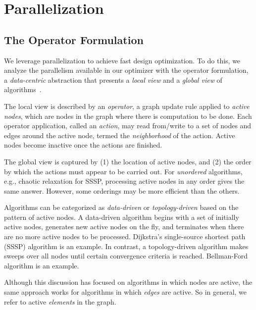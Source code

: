 \section{Parallelization}
\label{sec:parallel}

\subsection{The Operator Formulation}

We leverage parallelization to achieve fast design optimization. To do this, we analyze the parallelism available in our optimizer with the operator formulation, a {\em data-centric} abstraction that presents a {\em local view} and a {\em global view} of algorithms~\cite{pingali11}.

The local view is described by an {\em operator}, a graph update rule applied to {\em active nodes}, which are nodes in the graph where there is computation to be done. Each operator application, called an {\em action}, may read from/write to a set of nodes and edges around the active node, termed the {\em neighborhood} of the action. Active nodes become inactive once the actions are finished.

The global view is captured by (1) the location of active nodes, and (2) the order by which the actions must appear to be carried out. For {\em unordered} algorithms, e.g., chaotic relaxation for SSSP, processing active nodes in any order gives the same answer. However, some orderings may be more efficient than the others.


Algorithms can be categorized as {\em data-driven} or {\em topology-driven} based on the pattern of active nodes. A data-driven algorithm begins with a set of initially active nodes, generates new active nodes on the fly, and terminates when there are no more active nodes to be processed. Dijkstra's single-source shortest path (SSSP) algorithm is an example. In contrast, a topology-driven algorithm makes sweeps over all nodes until certain convergence criteria is reached. Bellman-Ford algorithm is an example.

Although this discussion has focused on algorithms in which nodes are active, the same approach works for algorithms in which \emph{edges} are active. So in general, we refer to active \emph{elements} in the graph.

